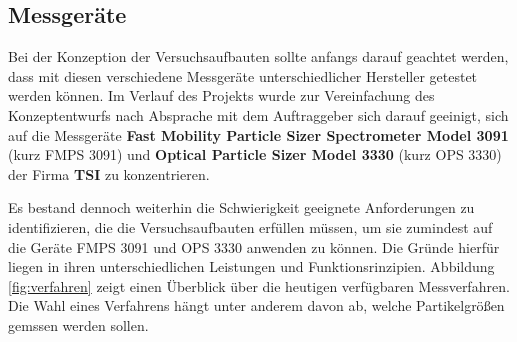 \subsection{Messger\"{a}te}
Bei der Konzeption der Versuchsaufbauten sollte anfangs darauf geachtet werden, dass mit diesen verschiedene Messger\"{a}te unterschiedlicher Hersteller getestet werden k\"{o}nnen. Im Verlauf des Projekts wurde zur Vereinfachung des Konzeptentwurfs nach Absprache mit dem Auftraggeber sich darauf geeinigt, sich auf die Messger\"{a}te \textbf{Fast Mobility Particle Sizer Spectrometer Model 3091} (kurz FMPS 3091) und \textbf{Optical Particle Sizer Model 3330} (kurz OPS 3330) der Firma \textbf{TSI} zu konzentrieren. 

Es bestand dennoch weiterhin die Schwierigkeit geeignete Anforderungen zu identifizieren, die die Versuchsaufbauten erf\"{u}llen m\"{u}ssen, um sie zumindest auf die Ger\"{a}te FMPS 3091 und OPS 3330 anwenden zu k\"{o}nnen. Die Gr\"{u}nde hierf\"{u}r liegen in ihren unterschiedlichen Leistungen und Funktionsrinzipien. Abbildung \ref{fig:verfahren} zeigt einen \"{U}berblick \"{u}ber die heutigen verf\"{u}gbaren Messverfahren. Die Wahl eines Verfahrens h\"{a}ngt unter anderem davon ab, welche Partikelgr\"{o}{\ss}en gemssen werden sollen. 

